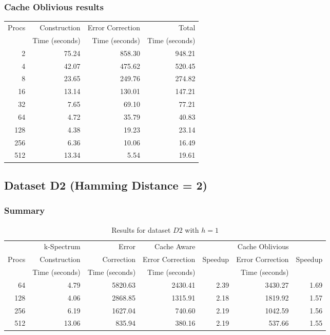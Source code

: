 \documentclass[integrals, nointegrals, article, 12pt, a4paper]{article}
\begin{document}
\subsubsection{Cache Oblivious results}
\label{sec-3-2-4}

\begin{center}
\begin{tabular}{rrrr}
\hline
Procs & Construction & Error Correction & Total\\
 & Time (seconds) & Time (seconds) & Time (seconds)\\
\hline
2 & 75.24 & 858.30 & 948.21\\
4 & 42.07 & 475.62 & 520.45\\
8 & 23.65 & 249.76 & 274.82\\
16 & 13.14 & 130.01 & 147.21\\
32 & 7.65 & 69.10 & 77.21\\
64 & 4.72 & 35.79 & 40.83\\
128 & 4.38 & 19.23 & 23.14\\
256 & 6.36 & 10.06 & 16.49\\
512 & 13.34 & 5.54 & 19.61\\
\hline
\end{tabular}
\end{center}

\subsection{Dataset D2 (Hamming Distance = 2)}
\label{sec-3-3}

\subsubsection{Summary}
\label{sec-3-3-1}

\begin{table}[htb]
\caption{\label{tab:d2h1run}Results for dataset $D2$ with $h = 1$}
\centering
\begin{tabular}{rrrrrrr}
\hline
 & k-Spectrum & Error & Cache Aware &  & Cache Oblivious & \\
Procs & Construction & Correction & Error Correction & Speedup & Error Correction & Speedup\\
 & Time (seconds) & Time (seconds) & Time (seconds) &  & Time (seconds) & \\
\hline
64 & 4.79 & 5820.63 & 2430.41 & 2.39 & 3430.27 & 1.69\\
128 & 4.06 & 2868.85 & 1315.91 & 2.18 & 1819.92 & 1.57\\
256 & 6.19 & 1627.04 & 740.60 & 2.19 & 1042.59 & 1.56\\
512 & 13.06 & 835.94 & 380.16 & 2.19 & 537.66 & 1.55\\
\hline
\end{tabular}
\end{table}
\end{document}

